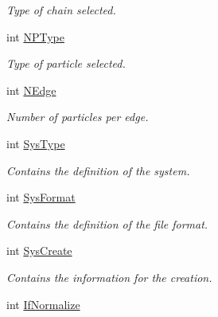 \begin{DoxyCompactItemize}
\begin{DoxyCompactList}\small\item\em Type of chain selected. \end{DoxyCompactList}\item 
int \hyperlink{classVarData_a4a5c47b800a1299ec5e54e369467dfeb}{N\+P\+Type}\hypertarget{classVarData_a4a5c47b800a1299ec5e54e369467dfeb}{}\label{classVarData_a4a5c47b800a1299ec5e54e369467dfeb}

\begin{DoxyCompactList}\small\item\em Type of particle selected. \end{DoxyCompactList}\item 
int \hyperlink{classVarData_ae2e67b49132b33a026b19c647cbf4f3c}{N\+Edge}\hypertarget{classVarData_ae2e67b49132b33a026b19c647cbf4f3c}{}\label{classVarData_ae2e67b49132b33a026b19c647cbf4f3c}

\begin{DoxyCompactList}\small\item\em Number of particles per edge. \end{DoxyCompactList}\item 
int \hyperlink{classVarData_ad396ed53d4010dad8257a97973324c40}{Sys\+Type}\hypertarget{classVarData_ad396ed53d4010dad8257a97973324c40}{}\label{classVarData_ad396ed53d4010dad8257a97973324c40}

\begin{DoxyCompactList}\small\item\em Contains the definition of the system. \end{DoxyCompactList}\item 
int \hyperlink{classVarData_acefa5842862d4587442db05af40e7490}{Sys\+Format}\hypertarget{classVarData_acefa5842862d4587442db05af40e7490}{}\label{classVarData_acefa5842862d4587442db05af40e7490}

\begin{DoxyCompactList}\small\item\em Contains the definition of the file format. \end{DoxyCompactList}\item 
int \hyperlink{classVarData_a65bbdadfbbcdbe903f9777e66b02920c}{Sys\+Create}\hypertarget{classVarData_a65bbdadfbbcdbe903f9777e66b02920c}{}\label{classVarData_a65bbdadfbbcdbe903f9777e66b02920c}

\begin{DoxyCompactList}\small\item\em Contains the information for the creation. \end{DoxyCompactList}\item 
int \hyperlink{classVarData_aee3b1f24c993a959f0c27ffe5a04d261}{If\+Normalize}\hypertarget{classVarData_aee3b1f24c993a959f0c27ffe5a04d261}{}\label{classVarData_aee3b1f24c993a959f0c27ffe5a04d261}


\end{DoxyCompactItemize}
